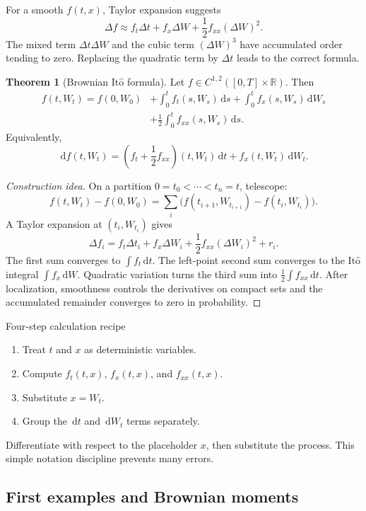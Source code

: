 \documentclass[10pt]{article}
\newcommand{\R}{\mathbb R}
\newcommand{\1}{\mathbf 1}
\newcommand{\dd}{\,\mathrm d}
\newcommand{\Ito}{\mathrm{It\hat{o}}}
\theoremstyle{definition}
\newtheorem{theorem}[definition]{Theorem}
\begin{document}
For a smooth \(f(t,x)\), Taylor expansion suggests
\[
\Delta f
\approx f_t\Delta t+f_x\Delta W+\frac12f_{xx}(\Delta W)^2.
\]
The mixed term \(\Delta t\Delta W\) and the cubic term
\((\Delta W)^3\) have accumulated order tending to zero. Replacing the
quadratic term by \(\Delta t\) leads to the correct formula.

\begin{theorem}[Brownian \(\Ito\) formula]
Let \(f\in C^{1,2}([0,T]\times\R)\). Then
\[
\begin{aligned}
f(t,W_t)=f(0,W_0)
&+\int_0^t f_t(s,W_s)\dd s
+\int_0^t f_x(s,W_s)\dd W_s\\
&+\frac12\int_0^t f_{xx}(s,W_s)\dd s.
\end{aligned}
\]
Equivalently,
\[
\boxed{
\dd f(t,W_t)
=\left(f_t+\frac12f_{xx}\right)(t,W_t)\dd t
+f_x(t,W_t)\dd W_t.}
\]
\end{theorem}

\begin{proof}[Construction idea]
On a partition \(0=t_0<\cdots<t_n=t\), telescope:
\[
f(t,W_t)-f(0,W_0)=\sum_i
\bigl(f(t_{i+1},W_{t_{i+1}})-f(t_i,W_{t_i})\bigr).
\]
A Taylor expansion at \((t_i,W_{t_i})\) gives
\[
\Delta f_i
=f_t\Delta t_i+f_x\Delta W_i
+\frac12f_{xx}(\Delta W_i)^2+r_i.
\]
The first sum converges to \(\int f_t\dd t\). The left-point second sum
converges to the \(\Ito\) integral \(\int f_x\dd W\). Quadratic variation
turns the third sum into \(\frac12\int f_{xx}\dd t\). After localization,
smoothness controls the derivatives on compact sets and the accumulated
remainder converges to zero in probability.
\end{proof}

\begin{keyidea}{Four-step calculation recipe}
\begin{enumerate}
  \item Treat \(t\) and \(x\) as deterministic variables.
  \item Compute \(f_t(t,x)\), \(f_x(t,x)\), and \(f_{xx}(t,x)\).
  \item Substitute \(x=W_t\).
  \item Group the \(\dd t\) and \(\dd W_t\) terms separately.
\end{enumerate}
Differentiate with respect to the placeholder \(x\), then substitute the
process. This simple notation discipline prevents many errors.
\end{keyidea}

\subsection{First examples and Brownian moments}
\end{document}
